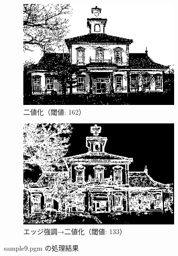 \documentclass[a4paper,12pt]{jsarticle}
\begin{document}
\begin{figure}[!htbp]
\begin{subfigure}[b]{0.45\textwidth}
    \centering
    \includegraphics[width=0.9\textwidth]{./images/binarized_sample9_binary.png}
    \caption{二値化（閾値: 162）}
\end{subfigure}
\hfill
\begin{subfigure}[b]{0.45\textwidth}
    \centering
    \includegraphics[width=0.9\textwidth]{./images/combined_sample9_combined.png}
    \caption{エッジ強調→二値化（閾値: 133）}
\end{subfigure}
\caption{sample9.pgm の処理結果}
\label{fig:sample9}
\end{figure}
\end{document}
